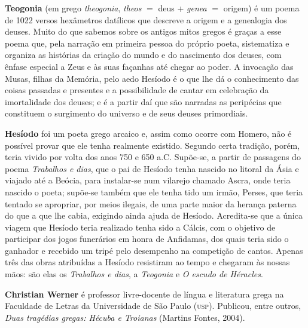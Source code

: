 \textbf{Teogonia} (em grego \textit{theogonia}, \textit{theos} $=$ deus +
\textit{genea} $=$ origem) é um poema de 1022 versos hexâmetros datílicos que
descreve a origem e a genealogia dos deuses. Muito do que sabemos sobre os
antigos mitos gregos é graças a esse poema que, pela narração em primeira
pessoa do próprio poeta, sistematiza e organiza as histórias da criação do
mundo e do nascimento dos deuses, com ênfase especial a Zeus e às suas façanhas até chegar ao poder. A invocação das Musas, filhas da Memória, pelo aedo Hesíodo é o que lhe dá o conhecimento das coisas passadas e presentes e a possibilidade de cantar em celebração da imortalidade dos deuses; e é a partir daí que são narradas as peripécias que constituem o surgimento do universo e de seus deuses primordiais.  

\textbf{Hesíodo} foi um poeta grego arcaico e, assim como ocorre com Homero, não é possível provar que ele tenha realmente existido. Segundo certa tradição, porém, teria vivido por volta dos anos 750 e 650 a.C.  Supõe-se, a partir de passagens do poema \textit{Trabalhos e dias}, que o pai de Hesíodo tenha nascido no litoral da Ásia e viajado até a Beócia, para instalar-se num vilarejo chamado Ascra, onde teria nascido o poeta; supõe-se também que ele tenha tido um irmão, Perses, que teria tentado se apropriar, por meios ilegais, de uma parte maior da herança paterna do que a que lhe cabia, exigindo ainda ajuda de Hesíodo. Acredita-se que a única viagem que Hesíodo teria realizado tenha sido a Cálcis, com o objetivo de participar dos jogos funerários em honra de Anfidamas, dos quais teria sido o ganhador e recebido um tripé pelo desempenho na competição de cantos. Apenas três das obras atribuídas a Hesíodo resistiram ao tempo e chegaram às nossas mãos: são elas os \textit{Trabalhos e dias}, a \textit{Teogonia} e \textit{O escudo de Héracles}.

\textbf{Christian Werner} é professor livre-docente de língua e literatura grega na Faculdade de Letras da Universidade de São Paulo (\textsc{usp}). Publicou, entre outros, \textit{Duas tragédias gregas: Hécuba e Troianas} (Martins Fontes, 2004).



